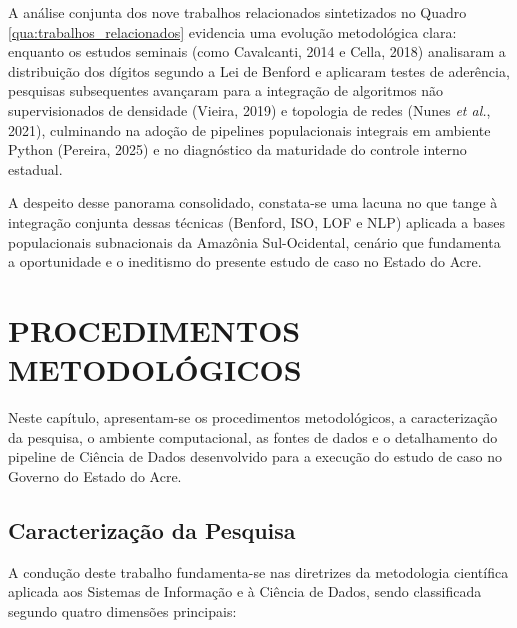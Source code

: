 \documentclass[
    12pt,               %
    openright,          %
    oneside,            %
    a4paper,            %
    chapter=TITLE,      %
    sumario=tradicional,%
    english,            %
    brazilian,          %
 ]{abntex2}
\begin{document}
A análise conjunta dos nove trabalhos relacionados sintetizados no Quadro \ref{qua:trabalhos_relacionados} evidencia uma evolução metodológica clara: enquanto os estudos seminais (como Cavalcanti, 2014 e Cella, 2018) analisaram a distribuição dos dígitos segundo a Lei de Benford e aplicaram testes de aderência, pesquisas subsequentes avançaram para a integração de algoritmos não supervisionados de densidade (Vieira, 2019) e topologia de redes (Nunes \textit{et al.}, 2021), culminando na adoção de pipelines populacionais integrais em ambiente Python (Pereira, 2025) e no diagnóstico da maturidade do controle interno estadual.

A despeito desse panorama consolidado, constata-se uma lacuna no que tange à integração conjunta dessas técnicas (Benford, ISO, LOF e NLP) aplicada a bases populacionais subnacionais da Amazônia Sul-Ocidental, cenário que fundamenta a oportunidade e o ineditismo do presente estudo de caso no Estado do Acre.

\chapter{PROCEDIMENTOS METODOLÓGICOS}\label{sec:metodologia}

Neste capítulo, apresentam-se os procedimentos metodológicos, a caracterização da pesquisa, o ambiente computacional, as fontes de dados e o detalhamento do pipeline de Ciência de Dados desenvolvido para a execução do estudo de caso no Governo do Estado do Acre.

\section{Caracterização da Pesquisa}\label{sec:caracterizacao_pesquisa}

A condução deste trabalho fundamenta-se nas diretrizes da metodologia científica aplicada aos Sistemas de Informação e à Ciência de Dados, sendo classificada segundo quatro dimensões principais:
\end{document}
